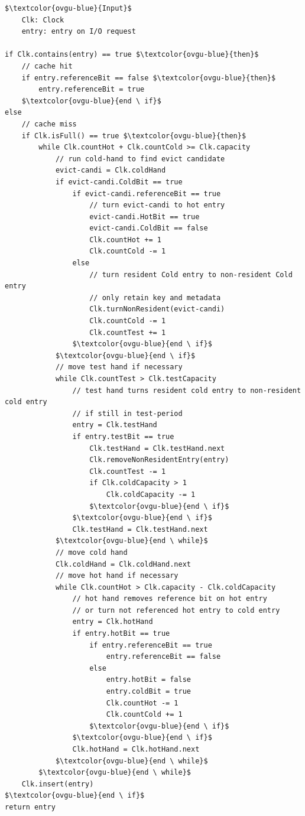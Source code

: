 \documentclass[
	12pt,
	a4paper,
	abstract,
	bibliography=totoc,
	chapterprefix,
	headings=openright,
	numbers=endperiod,
	parskip=half,
	twoside,
]{scrreprt}
\begin{document}
\newpage
\begin{lstlisting}[mathescape=true,caption=Clock-pro replacement algorithm in pseudocode,label=lst:clock-pro-algorithm]
$\textcolor{ovgu-blue}{Input}$
	Clk: Clock
	entry: entry on I/O request

if Clk.contains(entry) == true $\textcolor{ovgu-blue}{then}$
	// cache hit
	if entry.referenceBit == false $\textcolor{ovgu-blue}{then}$
		entry.referenceBit = true
	$\textcolor{ovgu-blue}{end \ if}$
else
	// cache miss
	if Clk.isFull() == true $\textcolor{ovgu-blue}{then}$
		while Clk.countHot + Clk.countCold >= Clk.capacity
			// run cold-hand to find evict candidate
			evict-candi = Clk.coldHand
			if evict-candi.ColdBit == true 
				if evict-candi.referenceBit == true
					// turn evict-candi to hot entry
					evict-candi.HotBit == true
					evict-candi.ColdBit == false
					Clk.countHot += 1
					Clk.countCold -= 1
				else
					// turn resident Cold entry to non-resident Cold entry
					// only retain key and metadata
					Clk.turnNonResident(evict-candi)
					Clk.countCold -= 1
					Clk.countTest += 1	
				$\textcolor{ovgu-blue}{end \ if}$
			$\textcolor{ovgu-blue}{end \ if}$
			// move test hand if necessary
			while Clk.countTest > Clk.testCapacity
				// test hand turns resident cold entry to non-resident cold entry
				// if still in test-period
				entry = Clk.testHand
				if entry.testBit == true
					Clk.testHand = Clk.testHand.next
					Clk.removeNonResidentEntry(entry)
					Clk.countTest -= 1
					if Clk.coldCapacity > 1
						Clk.coldCapacity -= 1
					$\textcolor{ovgu-blue}{end \ if}$
				$\textcolor{ovgu-blue}{end \ if}$
				Clk.testHand = Clk.testHand.next
			$\textcolor{ovgu-blue}{end \ while}$
			// move cold hand
			Clk.coldHand = Clk.coldHand.next
			// move hot hand if necessary
			while Clk.countHot > Clk.capacity - Clk.coldCapacity
				// hot hand removes reference bit on hot entry 
				// or turn not referenced hot entry to cold entry
				entry = Clk.hotHand
				if entry.hotBit == true
					if entry.referenceBit == true 
						entry.referenceBit == false
					else
						entry.hotBit = false
						entry.coldBit = true
						Clk.countHot -= 1
						Clk.countCold += 1
					$\textcolor{ovgu-blue}{end \ if}$
				$\textcolor{ovgu-blue}{end \ if}$
				Clk.hotHand = Clk.hotHand.next
			$\textcolor{ovgu-blue}{end \ while}$
		$\textcolor{ovgu-blue}{end \ while}$
	Clk.insert(entry)
$\textcolor{ovgu-blue}{end \ if}$	
return entry 
\end{lstlisting}
\end{document}
